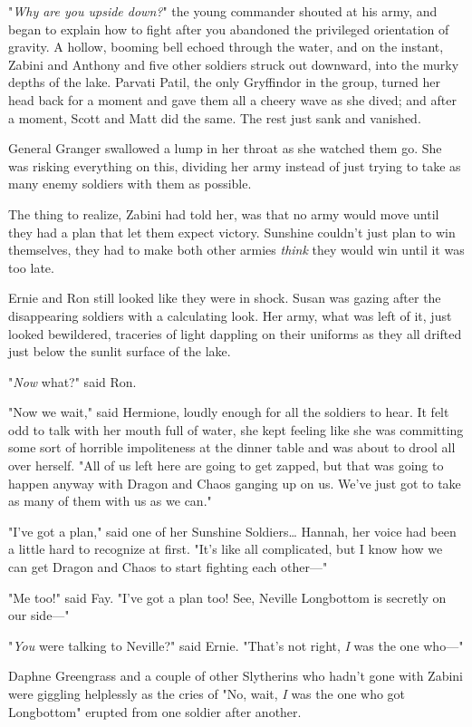 "\emph{Why are you upside down?}" the young commander shouted at his army, and
began to explain how to fight after you abandoned the privileged orientation of
gravity.
\later
A hollow, booming bell echoed through the water, and on the instant, Zabini and
Anthony and five other soldiers struck out downward, into the murky depths of
the lake. Parvati Patil, the only Gryffindor in the group, turned her head back
for a moment and gave them all a cheery wave as she dived; and after a moment,
Scott and Matt did the same. The rest just sank and vanished.

General Granger swallowed a lump in her throat as she watched them go. She was
risking everything on this, dividing her army instead of just trying to take as
many enemy soldiers with them as possible.

The thing to realize, Zabini had told her, was that no army would move until
they had a plan that let them expect victory. Sunshine couldn't just plan to
win themselves, they had to make both other armies \emph{think} they would win
until it was too late.

Ernie and Ron still looked like they were in shock. Susan was gazing after the
disappearing soldiers with a calculating look. Her army, what was left of it,
just looked bewildered, traceries of light dappling on their uniforms as they
all drifted just below the sunlit surface of the lake.

"\emph{Now} what?" said Ron.

"Now we wait," said Hermione, loudly enough for all the soldiers to hear. It
felt odd to talk with her mouth full of water, she kept feeling like she was
committing some sort of horrible impoliteness at the dinner table and was about
to drool all over herself. "All of us left here are going to get zapped, but
that was going to happen anyway with Dragon and Chaos ganging up on us. We've
just got to take as many of them with us as we can."

"I've got a plan," said one of her Sunshine Soldiers{\ldots} Hannah, her voice
had been a little hard to recognize at first. "It's like all complicated, but I
know how we can get Dragon and Chaos to start fighting each other---"

"Me too!" said Fay. "I've got a plan too! See, Neville Longbottom is secretly
on our side---"

"\emph{You} were talking to Neville?" said Ernie. "That's not right, \emph{I}
was the one who---"

Daphne Greengrass and a couple of other Slytherins who hadn't gone with Zabini
were giggling helplessly as the cries of "No, wait, \emph{I} was the one who
got Longbottom" erupted from one soldier after another.

